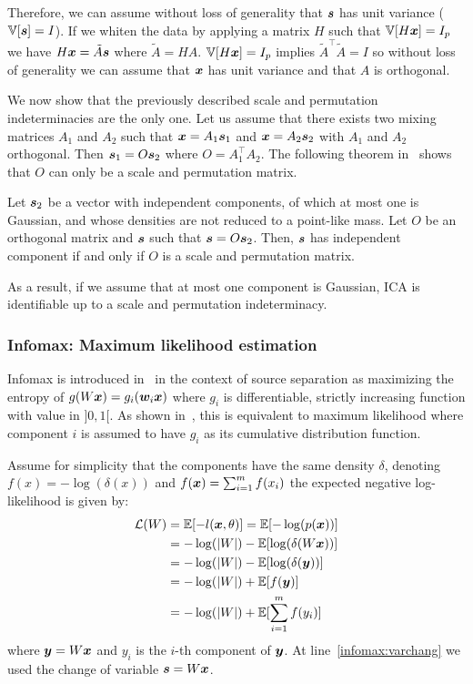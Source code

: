 Therefore, we can assume without loss of generality that $\boldsymbol{s}$ has unit variance ($\mathbb{V}[\boldsymbol{s}] = I$).
If we whiten the data by applying a matrix $H$ such that $\mathbb{V}[H \boldsymbol{x}] = I_p$ we have $H \boldsymbol{x} = \tilde{A} \boldsymbol{s}$ where $\tilde{A} = HA$. $\mathbb{V}[H \boldsymbol{x}] = I_p$ implies $\tilde{A}^{\top} \tilde{A} = I$ so without loss of generality we can assume that $\boldsymbol{x}$ has unit variance and that $A$ is orthogonal. 

We now show that the previously described scale and permutation
indeterminacies are the only one.
Let us assume that there exists two mixing matrices $A_1$ and $A_2$ such that
$\boldsymbol{x} = A_1 \boldsymbol{s}_1$ and $\boldsymbol{x} = A_2 \boldsymbol{s}_2$ with $A_1$ and $A_2$ orthogonal. Then $\boldsymbol{s}_1 = O \boldsymbol{s}_2$ where $O = A_1^{\top} A_2$.
The following theorem in~\cite{comon1994independent}
shows that $O$ can only be a scale and permutation matrix.
\begin{theorem}
  Let $\boldsymbol{s}_2$  be a  vector  with  independent 
  components, of   which  at  most  one  is  Gaussian,  and whose  densities
  are  not  reduced  to  a  point-like  mass. Let $O$ be an orthogonal matrix
  and $\boldsymbol{s}$ such that $\boldsymbol{s} = O \boldsymbol{s}_2$.
  Then, $\boldsymbol{s}$ has independent component if and only if $O$ is a scale and
  permutation matrix.
\end{theorem}

As a result, if we assume that at most one component is Gaussian, ICA is identifiable up to a scale and permutation indeterminacy.

\subsubsection{Infomax: Maximum likelihood estimation}
Infomax is introduced in~\cite{bell1995information} in the context of source
separation as maximizing the entropy of $g(W \boldsymbol{x}) = g_i(\boldsymbol{w}_i \boldsymbol{x})$ where  $g_i$
is differentiable, strictly increasing function with value in $]0, 1[$. As shown
in~\cite{cois1997infomax}, this is equivalent to
maximum likelihood where component $i$ is assumed to have $g_i$ as its
cumulative distribution function.

Assume for simplicity that the components have the same density $\delta$, denoting $f(x) =
-\log(\delta(x))$ and $f(\boldsymbol{x}) = \sum_{i=1}^m f(x_i)$ the expected negative log-likelihood is given by:
\begin{align}
  \mathcal{L}(W) &= \mathbb{E}[-l(\boldsymbol{x}, \theta)] = \mathbb{E}[- \log(p(\boldsymbol{x}))] \\
        &= -\log(|W|) - \mathbb{E}[\log(\delta(W \boldsymbol{x}))] \label{infomax:varchang} \\ 
        &= -\log(|W|) - \mathbb{E}[\log(\delta(\boldsymbol{y}))] \\
        &= -\log(|W|) + \mathbb{E}[f(\boldsymbol{y})] \\
        &= -\log(|W|) + \mathbb{E}[\sum_{i=1}^m f(y_i)]
\end{align}
where $\boldsymbol{y} = W \boldsymbol{x}$ and $y_i$ is the $i$-th component of $\boldsymbol{y}$.
At line~\eqref{infomax:varchang} we used the change of variable $\boldsymbol{s} = W \boldsymbol{x}$.

